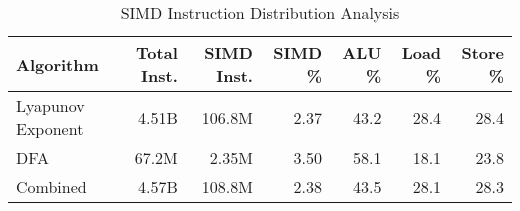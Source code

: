 \begin{table}[htbp]
\centering
\caption{SIMD Instruction Distribution Analysis}
\label{tab:simd_analysis}
\begin{tabular}{lrrrrrr}
\hline
Algorithm & Total Inst. & SIMD Inst. & SIMD \% & ALU \% & Load \% & Store \% \\
\hline
Lyapunov Exponent & 4.51B & 106.8M & 2.37 & 43.2 & 28.4 & 28.4 \\
DFA & 67.2M & 2.35M & 3.50 & 58.1 & 18.1 & 23.8 \\
Combined & 4.57B & 108.8M & 2.38 & 43.5 & 28.1 & 28.3 \\
\hline
\end{tabular}
\end{table}